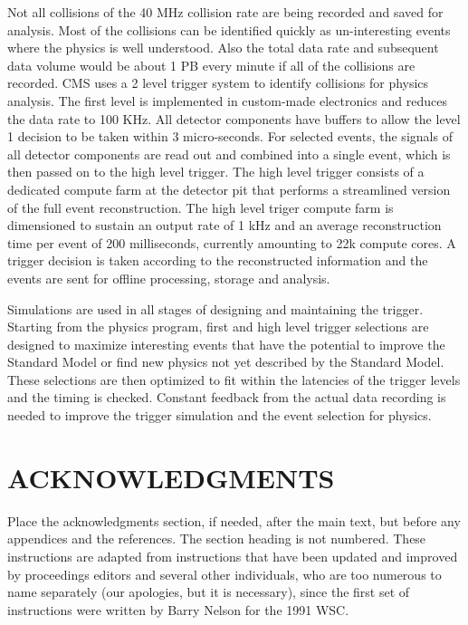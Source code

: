 \documentclass{wscpaperproc}
\theoremstyle{wsc}
\begin{document}
Not all collisions of the 40 MHz collision rate are being recorded and saved for analysis. Most of the collisions can be identified quickly as un-interesting events where the physics is well understood. Also the total data rate and subsequent data volume would be about 1 PB every minute if all of the collisions are recorded. CMS uses a 2 level trigger system to identify collisions for physics analysis. The first level is implemented in custom-made electronics and reduces the data rate to 100 KHz. All detector components have buffers to allow the level 1 decision to be taken within 3 micro-seconds. For selected events, the signals of all detector components are read out and combined into a single event, which is then passed on to the high level trigger. The high level trigger consists of a dedicated compute farm at the detector pit that performs a streamlined version of the full event reconstruction. The high level triger compute farm is dimensioned to sustain an output rate of 1 kHz and an average reconstruction time per event of 200 milliseconds, currently amounting to 22k compute cores. A trigger decision is taken according to the reconstructed information and the events are sent for offline processing, storage and analysis.

Simulations are used in all stages of designing and maintaining the trigger. Starting from the physics program, first and high level trigger selections are designed to maximize interesting events that have the potential to improve the Standard Model or find new physics not yet described by the Standard Model. These selections are then optimized to fit within the latencies of the trigger levels and the timing is checked. Constant feedback from the actual data recording is needed to improve the trigger simulation and the event selection for physics.



\section*{ACKNOWLEDGMENTS}
Place the acknowledgments section, if needed, after the main text, but before any appendices and the references. The section heading is not numbered.
These instructions are adapted from instructions that have been updated and improved by proceedings editors and several other individuals, who are too numerous to name separately (our apologies, but it is necessary), since the first set of instructions were written by Barry Nelson for the 1991 WSC.
\end{document}
